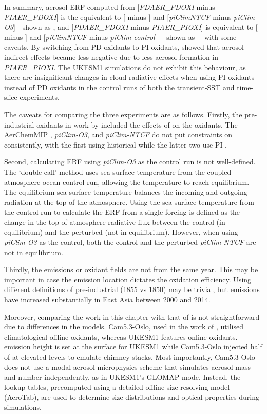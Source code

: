 In summary, aerosol ERF computed from [\textit{PDAER\_PDOXI} minus \textit{PIAER\_PDOXI}] is the equivalent to [\histsst{} minus \sstpiaer{}] and [\textit{piClimNTCF} minus \textit{piClim-O3}]---shown as \textdagger{}, and [\textit{PDAER\_PDOXI} minus \textit{PIAER\_PIOXI}] is equivalent to [\histsst{} minus \sstpintcf{}] and [\textit{piClimNTCF} minus \textit{piClim-control}]--- shown as \textdaggerdbl{}---with some caveats. By switching from PD oxidants to PI oxidants, \citet{karsetStrongImpactsAerosol2018} showed that aerosol indirect effects became less negative due to less aerosol formation in \textit{PIAER\_PIOXI}. The UKESM1 simulations do not exhibit this behaviour, as there are insignificant changes in cloud radiative effects when using PI oxidants instead of PD oxidants in the control runs of both the transient-SST and time-slice experiments. 

The caveats for comparing the three experiments are as follows. Firstly, the pre-industrial oxidants in work by \citet{karsetStrongImpactsAerosol2018} included the effects of  on the oxidants. The AerChemMIP \sstpintcf{}, \textit{piClim-O3}, and \textit{piClim-NTCF} do not put constraints on  consistently, with the first using historical  while the latter two use PI . 


Second, calculating ERF using \textit{piClim-O3} as the control run is not well-defined. The `double-call' method uses sea-surface temperature from the coupled atmosphere-ocean control run, allowing the temperature to reach equilibrium. The equilibrium sea-surface temperature balances the incoming and outgoing radiation at the top of the atmosphere. Using the sea-surface temperature from the control run to calculate the ERF from a single forcing is defined as the change in the top-of-atmosphere radiative flux between the control (in equilibrium) and the perturbed (not in equilibrium). However, when using \textit{piClim-O3} as the control, both the control and the perturbed \textit{piClim-NTCF} are not in equilibrium. 

Thirdly, the emissions or oxidant fields are not from the same year. This may be important in case the emission location dictates the oxidation efficiency. Using different definitions of pre-industrial (1855 vs 1850) may be trivial, but  emissions have increased substantially in East Asia between 2000 and 2014.


Moreover, comparing the work in this chapter with that of \citet{karsetStrongImpactsAerosol2018} is not straightforward due to differences in the models. Cam5.3-Oslo, used in the work of \citet{karsetStrongImpactsAerosol2018}, utilised climatological offline oxidants, whereas UKESM1 features online oxidants.  emission height is set at the surface for UKESM1 while Cam5.3-Oslo injected half of  at elevated levels to emulate chimney stacks. Most importantly, Cam5.3-Oslo does not use a modal aerosol microphysics scheme that simulates aerosol mass and number independently, as in UKESM1's GLOMAP mode. Instead, the lookup tables, precomputed using a detailed offline size-resolving model (AeroTab), are used to determine size distributions and optical properties during simulations. 


